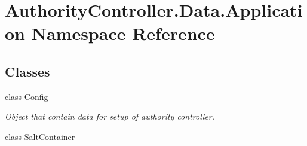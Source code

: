 \hypertarget{namespace_authority_controller_1_1_data_1_1_application}{}\section{Authority\+Controller.\+Data.\+Application Namespace Reference}
\label{namespace_authority_controller_1_1_data_1_1_application}
\subsection*{Classes}
\begin{DoxyCompactItemize}
\item 
class \mbox{\hyperlink{class_authority_controller_1_1_data_1_1_application_1_1_config}{Config}}
\begin{DoxyCompactList}\small\item\em Object that contain data for setup of authority controller. \end{DoxyCompactList}\item 
class \mbox{\hyperlink{class_authority_controller_1_1_data_1_1_application_1_1_salt_container}{Salt\+Container}}
\end{DoxyCompactItemize}
